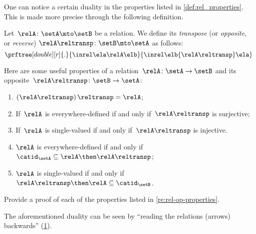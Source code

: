 One can notice a certain duality in the properties listed in \cref{def:rel_properties}.
This is made more precise through the following definition.


\begin{ctdefinition}
    \label{def:relation-transpose}
    Let~$\relA\colon \setA\mto \setB$ be a relation.
    We define its \emph{transpose} (or \emph{opposite}, or \emph{reverse}) $\relA\reltransp\colon \setB \mto \setA$ as follows:
    \begin{equation*}
        \prftree[double][r]{.}{
            \inrel \ela \relA \elb
        }{
            \inrel \elb {\relA\reltransp} \ela
        }
    \end{equation*}
\end{ctdefinition}
\begin{remark}
    \label{re:rel-op-properties}
    Here are some useful properties of a relation~$\relA\colon \setA\to \setB$  and its opposite~$\relA\reltransp\colon \setB\to \setA$:
    \begin{enumerate}
        \item $\left(\relA\reltransp\right)\reltransp = \relA $;
        \item If~$\relA$ is everywhere-defined if and only if~$\relA\reltransp$ is surjective;
        \item If~$\relA$ is single-valued if and only if~$\relA\reltransp$ is injective.
        \item $\relA$ is everywhere-defined if and only if~$\catid_\setA\subseteq \relA \then \relA\reltransp$;
        \item $\relA$ is single-valued if and only if~$\relA\reltransp\then \relA\subseteq \catid_\setB$.
    \end{enumerate}
\end{remark}

\begin{gradedexercise}
    \label{ex:RelProperties}
    Provide a proof of each of the properties listed in \cref{re:rel-op-properties}.
\end{gradedexercise}

\begin{remark}
    The aforementioned duality can be seen by ``reading the relations (arrows) backwards'' (\cref{fig:rel_transpose}).
\end{remark}

\begin{figure}[h!]
    \centering
    \caption{}
    \label{fig:rel_transpose}
\end{figure}
